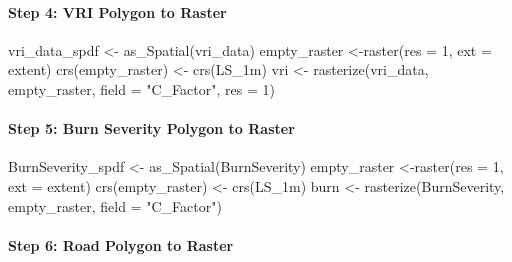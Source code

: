 \documentclass[
]{article}
\newenvironment{Shaded}{\begin{snugshade}}{\end{snugshade}}
\newcommand{\AttributeTok}[1]{\textcolor[rgb]{0.77,0.63,0.00}{#1}}
\newcommand{\DecValTok}[1]{\textcolor[rgb]{0.00,0.00,0.81}{#1}}
\newcommand{\FunctionTok}[1]{\textcolor[rgb]{0.00,0.00,0.00}{#1}}
\newcommand{\NormalTok}[1]{#1}
\newcommand{\OtherTok}[1]{\textcolor[rgb]{0.56,0.35,0.01}{#1}}
\newcommand{\StringTok}[1]{\textcolor[rgb]{0.31,0.60,0.02}{#1}}
\begin{document}
\hypertarget{sec-step-3-vri-polygon-to-raster-c}{%
\paragraph*{Step 4: VRI Polygon to Raster}\label{sec-step-3-vri-polygon-to-raster-c}}

\begin{Shaded}
\begin{Highlighting}[]
\NormalTok{vri\_data\_spdf }\OtherTok{\textless{}{-}} \FunctionTok{as\_Spatial}\NormalTok{(vri\_data)}
\NormalTok{empty\_raster }\OtherTok{\textless{}{-}}\FunctionTok{raster}\NormalTok{(}\AttributeTok{res =} \DecValTok{1}\NormalTok{, }\AttributeTok{ext =}\NormalTok{ extent)}
\FunctionTok{crs}\NormalTok{(empty\_raster) }\OtherTok{\textless{}{-}} \FunctionTok{crs}\NormalTok{(LS\_1m)}
\NormalTok{vri }\OtherTok{\textless{}{-}} \FunctionTok{rasterize}\NormalTok{(vri\_data, empty\_raster, }\AttributeTok{field =} \StringTok{"C\_Factor"}\NormalTok{, }\AttributeTok{res =} \DecValTok{1}\NormalTok{)}
\end{Highlighting}
\end{Shaded}

\hypertarget{sec-step-5-burn-severity-polygon-to-raster}{%
\paragraph*{Step 5: Burn Severity Polygon to Raster}\label{sec-step-5-burn-severity-polygon-to-raster}}

\begin{Shaded}
\begin{Highlighting}[]
\NormalTok{BurnSeverity\_spdf }\OtherTok{\textless{}{-}} \FunctionTok{as\_Spatial}\NormalTok{(BurnSeverity)}
\NormalTok{empty\_raster }\OtherTok{\textless{}{-}}\FunctionTok{raster}\NormalTok{(}\AttributeTok{res =} \DecValTok{1}\NormalTok{, }\AttributeTok{ext =}\NormalTok{ extent)}
\FunctionTok{crs}\NormalTok{(empty\_raster) }\OtherTok{\textless{}{-}} \FunctionTok{crs}\NormalTok{(LS\_1m)}
\NormalTok{burn }\OtherTok{\textless{}{-}} \FunctionTok{rasterize}\NormalTok{(BurnSeverity, empty\_raster, }\AttributeTok{field =} \StringTok{"C\_Factor"}\NormalTok{)}
\end{Highlighting}
\end{Shaded}

\hypertarget{sec-step-5-road-polygon-to-raster-c}{%
\paragraph*{Step 6: Road Polygon to Raster}\label{sec-step-5-road-polygon-to-raster-c}}
\end{document}
